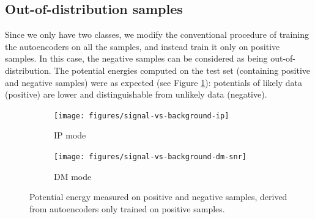 \subsection*{Out-of-distribution samples}
Since we only have two classes, we modify the conventional procedure of training the autoencoders on all the samples, and instead train it only on positive samples. In this case, the negative samples can be considered as being out-of-distribution. The potential energies computed on the test set (containing positive and negative samples) were as expected (see Figure \ref{fig:pot-oof-signal}): potentials of likely data (positive) are lower and distinguishable from unlikely data (negative).
\begin{figure}[!h]
\centering
\begin{subfigure}{.5\textwidth}
  \centering
  \texttt{[image: figures/signal-vs-background-ip]}
   \caption{IP mode}
\end{subfigure}%
\begin{subfigure}{.5\textwidth}
  \centering
  \texttt{[image: figures/signal-vs-background-dm-snr]}
   \caption{DM mode}
\end{subfigure}
\caption{Potential energy measured on positive and negative samples, derived from autoencoders only trained on positive samples.}
\label{fig:pot-oof-signal}
\end{figure}



